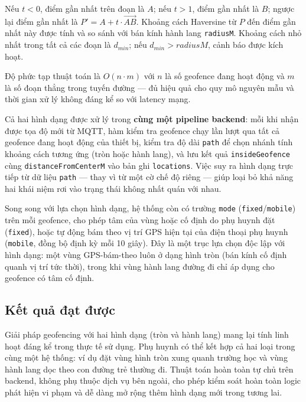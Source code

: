 \documentclass[../DoAn.tex]{subfiles}
\begin{document}
Nếu $t < 0$, điểm gần nhất trên đoạn là $A$; nếu $t > 1$, điểm gần nhất là $B$; ngược lại điểm gần nhất là $P' = A + t \cdot \overrightarrow{AB}$. Khoảng cách Haversine từ $P$ đến điểm gần nhất này được tính và so sánh với bán kính hành lang \texttt{radiusM}. Khoảng cách nhỏ nhất trong tất cả các đoạn là $d_{min}$; nếu $d_{min} > radiusM$, cảnh báo được kích hoạt.

Độ phức tạp thuật toán là $O(n \cdot m)$ với $n$ là số geofence đang hoạt động và $m$ là số đoạn thẳng trong tuyến đường — đủ hiệu quả cho quy mô nguyên mẫu và thời gian xử lý không đáng kể so với latency mạng.

Cả hai hình dạng được xử lý trong \textbf{cùng một pipeline backend}: mỗi khi nhận được tọa độ mới từ MQTT, hàm kiểm tra geofence chạy lần lượt qua tất cả geofence đang hoạt động của thiết bị, kiểm tra độ dài \texttt{path} để chọn nhánh tính khoảng cách tương ứng (tròn hoặc hành lang), và lưu kết quả \texttt{insideGeofence} cùng \texttt{distanceFromCenterM} vào bản ghi \texttt{locations}. Việc suy ra hình dạng trực tiếp từ dữ liệu \texttt{path} — thay vì từ một cờ chế độ riêng — giúp loại bỏ khả năng hai khái niệm rơi vào trạng thái không nhất quán với nhau.

Song song với lựa chọn hình dạng, hệ thống còn có trường \texttt{mode} (\texttt{fixed}/\texttt{mobile}) trên mỗi geofence, cho phép tâm của vùng hoặc cố định do phụ huynh đặt (\texttt{fixed}), hoặc tự động bám theo vị trí GPS hiện tại của điện thoại phụ huynh (\texttt{mobile}, đồng bộ định kỳ mỗi 10 giây). Đây là một trục lựa chọn độc lập với hình dạng: một vùng GPS-bám-theo luôn ở dạng hình tròn (bán kính cố định quanh vị trí tức thời), trong khi vùng hành lang đường đi chỉ áp dụng cho geofence có tâm cố định.

\subsection{Kết quả đạt được}

Giải pháp geofencing với hai hình dạng (tròn và hành lang) mang lại tính linh hoạt đáng kể trong thực tế sử dụng. Phụ huynh có thể kết hợp cả hai loại trong cùng một hệ thống: ví dụ đặt vùng hình tròn xung quanh trường học và vùng hành lang dọc theo con đường trẻ thường đi. Thuật toán hoàn toàn tự chủ trên backend, không phụ thuộc dịch vụ bên ngoài, cho phép kiểm soát hoàn toàn logic phát hiện vi phạm và dễ dàng mở rộng thêm hình dạng mới trong tương lai.

\end{document}
